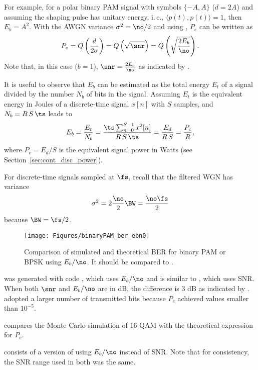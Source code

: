 For example, for a polar binary PAM signal with symbols $\{-A,A\}$ ($d=2A$) and assuming the shaping pulse has unitary energy, i.\,e., $\langle p(t),p(t) \rangle =1$,  then $E_b = A^2$. With the AWGN variance $\sigma^2 = \no/2$ and using , $P_e$ can be written as
\[
P_e = Q \left( \frac{d}{2 \sigma} \right) = Q \left( \sqrt{ \snr } \right) = Q \left( \sqrt{\frac{2 E_b}{\no}} \right).
\]
Note that, in this case ($b=1$), $\snr = \frac{2 E_b}{\no}$ as indicated by .

It is useful to observe that $E_b$ can be estimated as the total energy $E_t$ of a signal divided by the number $N_b$ of bits in the signal. Assuming $E_t$ is the equivalent energy in Joules of a discrete-time signal $x[n]$ with $S$ samples,  and $N_b = R \, S \, \ts$ leads to
\[
E_b = \frac{E_t}{N_b} = \frac{\ts \sum_{n=0}^{S-1}{x^2[n]}}{R \, S \, \ts} = \frac{E_d}{R \, S} = \frac{P_c}{R},
\]
where $P_c = E_d / S$ is the equivalent signal power in Watts (see Section~\ref{sec:cont_disc_power}).

For discrete-time signals sampled at $\fs$, recall that the filtered WGN has variance
\[
\sigma^2 = 2 \frac{\no}{2} \BW = \frac{\no \fs}{2}
\]
because $\BW=\fs/2$.

\begin{figure}[htbp]
\centering
\texttt{[image: Figures/binaryPAM\_ber\_ebn0]}
\caption{Comparison of simulated and theoretical BER for binary PAM or BPSK using $E_b/\no$. It should be compared to .\label{fig:binaryPAM_ber_ebn0}}
\end{figure}

 was generated with code , which uses $E_b/\no$ and is similar to , which uses SNR. When both $\snr$ and $E_b/\no$ are in dB, the difference is 3 dB as indicated by .  adopted a larger number of transmitted bits because $P_e$ achieved values smaller than $10^{-5}$.


 compares the Monte Carlo simulation of 16-QAM with the theoretical expression for $P_e$.


 consists of a version of  using $E_b/\no$ instead of SNR. Note that for consistency, the SNR range used in both was the same.

